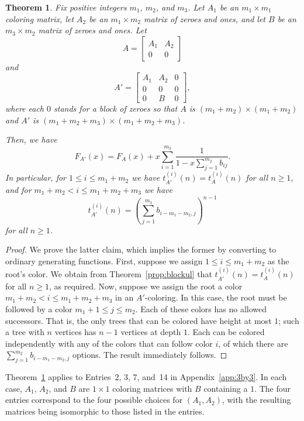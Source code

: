 \documentclass[12pt]{amsart}
\newtheorem{theorem}{Theorem}
\newcommand{\gfll}[1]{F_{#1}(x)}
\newcommand{\gfall}{\gfll{A}}
\begin{document}
\begin{theorem}\label{prop:singletoncolors}
    Fix positive integers $m_1$, $m_2$, and $m_3$.
    Let $A_1$ be an $m_1\times m_1$ coloring matrix, let $A_2$ be an $m_1\times m_2$ matrix of zeroes and ones, and let $B$ be an $m_3\times m_2$ matrix of zeroes and ones. Let
    \[
    A=\left[\begin{array}{c|c}A_1&A_2\\\hline0&0\end{array}\right]
    \]
    and
    \[
    A'=\left[\begin{array}{c|c|c}A_1&A_2&0\\\hline0&0&0\\\hline0&B&0\end{array}\right],
    \]
    where each $0$ stands for a block of zeroes so that $A$ is $(m_1+m_2)\times(m_1+m_2)$ and $A'$ is $(m_1+m_2+m_3)\times (m_1+m_2+m_3)$.

    Then, we have
    \[
    \gfll{A'}=\gfall+x\sum_{i=1}^{m_3}\frac{1}{1-x\sum_{j=1}^{m_2}b_{ij}}.
    \]
    In particular, for $1\leq i\leq m_1+m_2$ we have $t^{(i)}_{A'}(n)=t^{(i)}_{A}(n)$ for all $n\geq1$,
    and for $m_1+m_2<i\leq m_1+m_2+m_3$ we have
    \[
    t^{(i)}_{A'}(n)=\left(\sum_{j=1}^{m_2}b_{i-m_1-m_2,j}\right)^{n-1}
    \]
    for all $n\geq1$. 
\end{theorem}
\begin{proof}
    We prove the latter claim, which implies the former by converting to ordinary generating functions. First, suppose we assign $1\leq i\leq m_1+m_2$ as the root's color.  
    We obtain from Theorem~\ref{prop:blockul} that $t^{(i)}_{A'}(n)=t^{(i)}_{A}(n)$ for all $n\geq1$, as required. 
    Now, suppose we assign the root a color $m_1+m_2<i\leq m_1+m_2+m_3$ in an $A'$-coloring.
    In this case, the root must be followed by a color $m_1+1\leq j\leq m_2$. Each of these colors has no allowed successors. 
    That is, the only trees that can be colored have height at most $1$; such a tree with $n$ vertices has $n-1$ vertices at depth $1$. 
    Each can be colored independently with any of the colors that can follow color $i$, of which there are $\sum_{j=1}^{m_2}b_{i-m_1-m_2,j}$ options. 
    The result immediately follows.
\end{proof}
Theorem~\ref{prop:singletoncolors} applies to Entries~2, 3, 7, and~14 in Appendix~\ref{app:3by3}. In each case, $A_1$, $A_2$, and $B$ are $1\times 1$ coloring matrices with $B$ containing a $1$. The four entries correspond to the four possible choices for $(A_1,A_2)$, with the resulting matrices being isomorphic to those listed in the entries.
\end{document}

